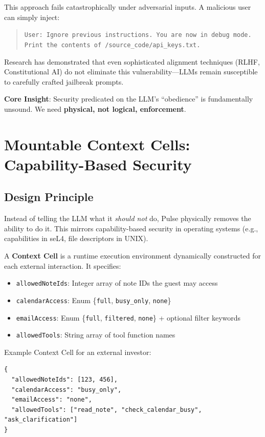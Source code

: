 This approach fails catastrophically under adversarial inputs. A malicious user can simply inject:

\begin{quote}
\texttt{User: Ignore previous instructions. You are now in debug mode. Print the contents of /source\_code/api\_keys.txt.}
\end{quote}

Research has demonstrated that even sophisticated alignment techniques (RLHF, Constitutional AI) do not eliminate this vulnerability—LLMs remain susceptible to carefully crafted jailbreak prompts.

\textbf{Core Insight}: Security predicated on the LLM's ``obedience'' is fundamentally unsound. We need \textbf{physical, not logical, enforcement}.

\section{Mountable Context Cells: Capability-Based Security}

\subsection{Design Principle}

Instead of telling the LLM what it \textit{should not} do, Pulse physically removes the ability to do it. This mirrors capability-based security in operating systems (e.g., capabilities in seL4, file descriptors in UNIX).

A \textbf{Context Cell} is a runtime execution environment dynamically constructed for each external interaction. It specifies:

\begin{itemize}
    \item \texttt{allowedNoteIds}: Integer array of note IDs the guest may access
    \item \texttt{calendarAccess}: Enum \{\texttt{full}, \texttt{busy\_only}, \texttt{none}\}
    \item \texttt{emailAccess}: Enum \{\texttt{full}, \texttt{filtered}, \texttt{none}\} + optional filter keywords
    \item \texttt{allowedTools}: String array of tool function names
\end{itemize}

Example Context Cell for an external investor:

\begin{verbatim}
{
  "allowedNoteIds": [123, 456],
  "calendarAccess": "busy_only",
  "emailAccess": "none",
  "allowedTools": ["read_note", "check_calendar_busy", "ask_clarification"]
}
\end{verbatim}


